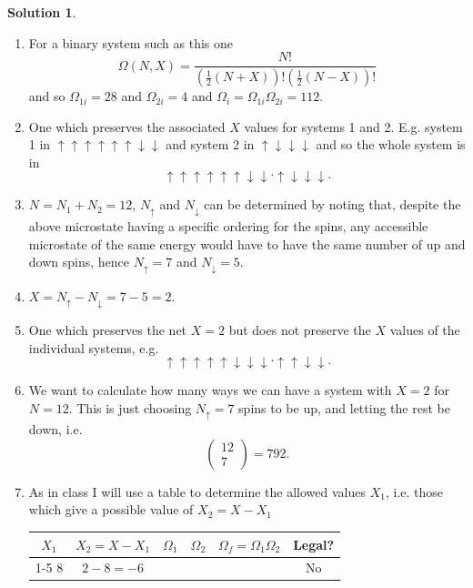 \documentclass[10pt]{article}
\theoremstyle{definition}
\newtheorem{soln}{Solution}
\begin{document}
\begin{soln}~
  \begin{enumerate}[label=(\alph*)]
    \item For a binary system such as this one
          $$\Omega(N,X)=\frac{N!}{\left(\frac{1}{2}(N+X)\right)!\left(\frac{1}{2}(N-X)\right)!}$$
          and so $\Omega_{1i}=28$ and $\Omega_{2i}=4$ and $\Omega_{i}=\Omega_{1i}\Omega_{2i}=112$.
    \item One which preserves the associated $X$ values for systems 1 and 2. E.g. system 1 in
          $\uparrow\uparrow\uparrow\uparrow\uparrow\uparrow\downarrow\downarrow$ and system 2 in
          $\uparrow\downarrow\downarrow\downarrow$ and so the whole system is in
          $$\uparrow\uparrow\uparrow\uparrow\uparrow\uparrow\downarrow\downarrow\cdot \uparrow\downarrow\downarrow\downarrow.$$
    \item $N=N_1+N_2=12$, $N_\uparrow$ and $N_\downarrow$ can be determined by noting that, despite the above microstate having a
          specific ordering for the spins, any accessible microstate of the same energy would have to have the same number of up and down spins, hence
          $N_\uparrow=7$ and $N_\downarrow=5$.
    \item $X=N_\uparrow-N_\downarrow=7-5=2$.
    \item One which preserves the net $X=2$ but does not preserve the $X$ values of the individual systems, e.g.
          $$\uparrow\uparrow\uparrow\uparrow\uparrow\downarrow\downarrow\downarrow\cdot \uparrow\uparrow\downarrow\downarrow.$$
    \item We want to calculate how many ways we can have a system with $X=2$ for $N=12$. This is just choosing $N_\uparrow=7$
          spins to be up, and letting the rest be down, i.e.
          $$\begin{pmatrix}
              12 \\
              7
            \end{pmatrix}=792.$$
    \item As in class I will use a table to determine the allowed values $X_1$, i.e. those which give a possible value of $X_2=X-X_1$
          \begin{center}
            \begin{tabular}{c|c|c|c|c|c}
              $X_1$  & $X_2=X-X_1$ & $\Omega_1$ & $\Omega_2$ & $\Omega_f=\Omega_1\Omega_2$ & Legal? \\
              \cline{1-5}
              $8$    & $2-8=-6$    &            &            &                             & No     \\

\end{tabular}
\end{center}
\end{enumerate}
\end{soln}
\end{document}
